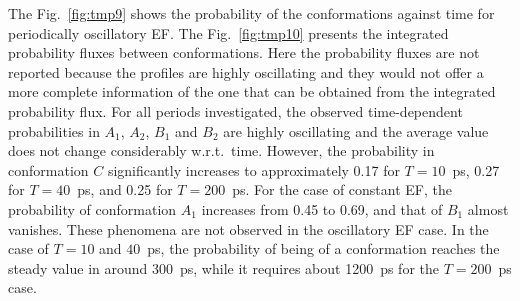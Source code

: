 \documentclass[a4paper,preprint,unsortedaddress,onecolumn]{revtex4-1}
\begin{document}
The Fig.~\ref{fig:tmp9} shows the probability of the
conformations against time for periodically oscillatory EF.  The
Fig.~\ref{fig:tmp10} presents the integrated probability fluxes between
conformations. Here the probability fluxes are not reported
because the profiles are highly oscillating and they would not offer 
 a more complete information of the one that can be obtained from the integrated probability flux.
For all periods investigated,
the observed time-dependent probabilities  in $A_1$, $A_2$, $B_1$ and $B_2$ are
highly oscillating and the average value does not change
considerably w.r.t.~time.
However, the probability in conformation $C$ significantly
increases to approximately 0.17 for $T=10$~ps, 0.27 for  $T=40$~ps, and
0.25 for $T=200$~ps.
For the case of constant EF, the probability of conformation $A_1$
increases from 0.45 to 0.69, and that of $B_1$ almost vanishes.
These phenomena are not observed in the oscillatory EF case.
In the case of $T=10$ and $40$~ps, the probability of being of a conformation
reaches the steady value in around 300~ps, while it requires about 1200~ps
for the $T=200$~ps case. 
\end{document}
